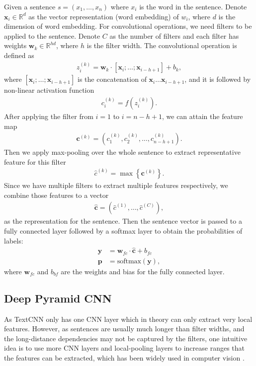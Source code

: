 \documentclass[11pt,letterpaper]{article}
\begin{document}
    Given a sentence $s=(x_1, \dots, x_n)$ where $x_i$ is the word in the
    sentence. Denote $\mathbf{x}_i \in \mathbb{R}^d$ as the vector 
    representation (word embedding) of $w_i$, where $d$ is the dimension of word 
    embedding. For convolutional operations, we need filters to be applied to 
    the sentence. Denote $C$ as the number of filters and each filter has 
    weights $\mathbf{w}_k\in\mathbb{R}^{hd}$, where $h$ is the filter width. The
    convolutional operation is defined as 
    \begin{align}
        z^{(k)}_i = \mathbf{w}_k \cdot \left[\mathbf{x}_i;\dots;\mathbf{x}_{i-h+1} \right] + b_k,
    \end{align} 
    where $\left[\mathbf{x}_i;\dots;\mathbf{x}_{i-h+1} \right]$ is the 
    concatenation of $\mathbf{x}_i\dots\mathbf{x}_{i-h+1}$, and it is followed 
    by non-linear activation function
    \begin{align}
        c^{(k)}_i = f(z^{(k)}_i).
    \end{align}
    After applying the filter from $i=1$ to $i=n-h+1$, we can attain the feature 
    map 
    \begin{align}
        \mathbf{c}^{(k)} = \left(c^{(k)}_1, c^{(k)}_2, \dots, c^{(k)}_{n-h+1}\right).
    \end{align}
    Then we apply max-pooling over the whole sentence to extract representative 
    feature for this filter
    \begin{align}
        \widehat{c}^{(k)} = \max\left\{\mathbf{c}^{(k)}\right\}.
    \end{align}
    Since we have multiple filters to extract multiple features respectively, we
    combine those features to a vector
    \begin{align}
        \widehat{\mathbf{c}} = \left(\widehat{c}^{(1)},\dots,\widehat{c}^{(C)}\right),
    \end{align}
    as the representation for the sentence. Then the sentence vector is passed
    to a fully connected layer followed by a softmax layer to obtain the 
    probabilities of labels:
    \begin{align}
        \mathbf{y} &= \mathbf{w}_{fc} \cdot \widehat{\mathbf{c}} + b_{fc} \\
        \mathbf{p} &= \text{softmax}(\mathbf{y}),
    \end{align}
    where $\mathbf{w}_{fc}$ and $b_{bf}$ are the weights and bias for the fully
    connected layer.

\subsection{Deep Pyramid CNN}
    As TextCNN only has one CNN layer which in theory can only extract very
    local features. However, as sentences are usually much longer than filter
    widths, and the long-distance dependencies may not be captured by the 
    filters, one intuitive idea is to use more CNN layers and local-pooling 
    layers to increase ranges that the features can be extracted, which has been 
    widely used in computer vision \cite{NIPS2012_4824,simonyan2014very,he2016deep,he2016identity}.
\end{document}
